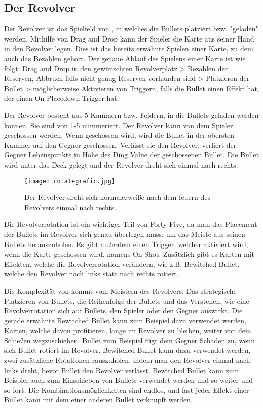 \subsection{Der Revolver}\label{der_revolver}
Der Revolver ist das Spielfeld von \FF, in welches die Bullets platziert bzw. "geladen" werden.
Mithilfe von Drag and Drop kann der Spieler die Karte aus seiner Hand in den Revolver legen.
Dies ist das bereits erwähnte Spielen einer Karte, zu dem auch das Bezahlen gehört.
Der genaue Ablauf des Spielens einer Karte ist wie folgt:
Drag and Drop in den gewünschten Revolverplatz > Bezahlen der Reserven, Abbruch falls nicht genug Reserven vorhanden sind > Platzieren der Bullet > möglicherweise Aktivieren von Triggern, falls die Bullet einen Effekt hat, der einen On-Placedown Trigger hat.


Der Revolver besteht aus 5 Kammern bzw. Feldern, in die Bullets geladen werden können.
Sie sind von 1-5 nummeriert.
Der Revolver kann von dem Spieler geschossen werden. Wenn geschossen wird, wird die Bullet in der obersten Kammer auf den Gegner geschossen.
Verlässt sie den Revolver, verliert der Gegner Lebenspunkte in Höhe des Dmg Value der geschossenen Bullet.
Die Bullet wird unter das Deck gelegt und der Revolver dreht sich einmal nach rechts.

\begin{figure}[H]
    \texttt{[image: rotategrafic.jpg]}
    \caption{Der Revolver dreht sich normalerweiße nach dem feuern des Revolvers einmal nach rechts.}
\end{figure}


Die Revolverrotation ist ein wichtiger Teil von Forty-Five, da man das Placement der Bullets im Revolver sich genau überlegen muss,
um das Meiste aus seinen Bullets herauszuholen.
Es gibt außerdem einen Trigger, welcher aktiviert wird, wenn die Karte geschossen wird,
namens On-Shot. Zusätzlich gibt es Karten mit Effekten, welche die Revolverrotation verändern, wie z.B. Bewitched Bullet,
welche den Revolver nach links statt nach rechts rotiert.

Die Komplexität von \FF kommt vom Meistern des Revolvers.
Das strategische Platzieren von Bullets, die Reihenfolge der Bullets und das Verstehen, wie eine Revolverrotation sich auf Bullets,
den Spieler oder den Gegner auswirkt. Die gerade erwähnte Bewitched Bullet kann zum Beispiel dazu verwendet werden, Karten,
welche davon profitieren, lange im Revolver zu bleiben, weiter von dem Schießen wegzuschieben. Bullet zum Beispiel fügt dem Gegner Schaden zu,
wenn sich Bullet rotiert im Revolver.
Bewitched Bullet kann dazu verwendet werden, zwei zusätzliche Rotationen rauszuholen, indem man den Revolver einmal nach
links dreht, bevor Bullet den Revolver verlässt. Bewitched Bullet kann zum Beispiel auch zum Einschieben von Bullets verwendet
werden und so weiter und so fort. Die Kombinationsmöglichkeiten sind endlos, und fast jeder Effekt einer Bullet kann mit dem einer
anderen Bullet verknüpft werden.



